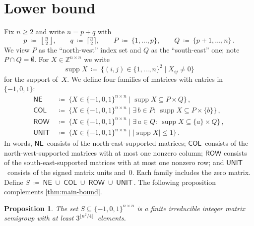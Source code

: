 \documentclass{lmcs}
\newtheorem{proposition}[thm]{Proposition}
\theoremstyle{definition}
\DeclareMathOperator{\supp}{supp}
\newcommand{\COL}{\mathsf{COL}}
\newcommand{\NE}{\mathsf{NE}}
\newcommand{\ROW}{\mathsf{ROW}}
\newcommand{\UNIT}{\mathsf{UNIT}}
\newcommand{\Z}{\mathbb{Z}}
\begin{document}
\section{Lower bound} \label{sec:lower}
Fix $n \ge 2$ and write $n = p+q$ with
\[
  p \ \coloneqq \ \left\lfloor \tfrac{n}{2} \right\rfloor, \qquad 
  q \ \coloneqq \ \big\lceil \tfrac{n}{2} \big\rceil, \qquad
  P \ \coloneqq \ \{1,\ldots,p\}, \qquad 
  Q \ \coloneqq \ \{p+1,\ldots,n\}\,.
\]
We view $P$ as the ``north-west'' index set and $Q$ as the ``south-east'' one; note $P \cap Q = \emptyset$. 
For $X \in \Z^{n\times n}$ we write
\[
  \supp X \ \coloneqq \ \{(i,j)\in\{1,\dots,n\}^2 \mid X_{ij}\neq 0\}
\]
for the support of~$X$.
We define four families of matrices with entries in  $\{-1, 0, 1\}$:
\begin{align*}
\NE   \ &\coloneqq\ \{X \in \{-1,0,1\}^{n\times n} \mid \supp X \subseteq P\times Q\}\,,\\
\COL  \ &\coloneqq\ \{X \in \{-1,0,1\}^{n\times n} \mid \exists\, b \in P:\ \supp X \subseteq P \times \{b\}\}\,,\\
\ROW  \ &\coloneqq\ \{X \in \{-1,0,1\}^{n\times n} \mid \exists\, a \in Q:\ \supp X \subseteq \{a\} \times Q\}\,,\\
\UNIT \ &\coloneqq\ \{X \in \{-1,0,1\}^{n\times n} \mid |\supp X| \le 1\}\,.
\end{align*}
In words, $\NE$~consists of the north-east-supported matrices; $\COL$~consists of the north-west-supported matrices with at most one nonzero column; $\ROW$ consists of the south-east-supported matrices with at most one nonzero row; and $\UNIT$~consists of the signed matrix units and~$0$.
Each family includes the zero matrix.
Define
$
  S\ \coloneqq \ \NE \;\cup\; \COL \;\cup\; \ROW \;\cup\; \UNIT\,.
$
The following proposition complements \cref{thm:main-bound}.
\begin{proposition} \label{prop:lower}
The set $S \subseteq \{-1,0,1\}^{n \times n}$ is a finite irreducible integer matrix semigroup with at least $3^{\lfloor n^2/4 \rfloor}$~elements.
\end{proposition}
\end{document}
